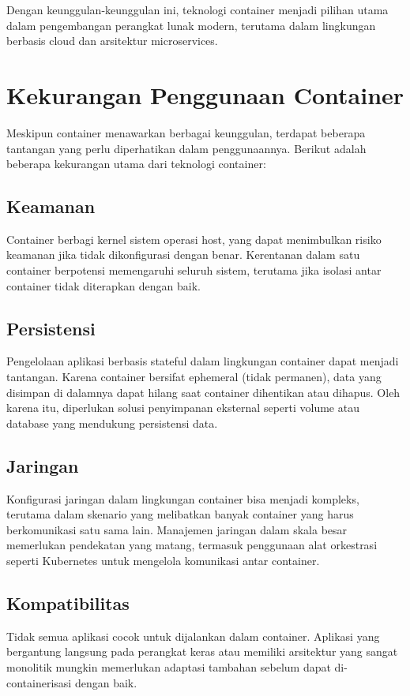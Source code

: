 Dengan keunggulan-keunggulan ini, teknologi container menjadi pilihan utama dalam pengembangan perangkat lunak modern, terutama dalam lingkungan berbasis cloud dan arsitektur microservices.



\section{Kekurangan Penggunaan Container}

Meskipun container menawarkan berbagai keunggulan, terdapat beberapa tantangan yang perlu diperhatikan dalam penggunaannya. Berikut adalah beberapa kekurangan utama dari teknologi container:

\subsection{Keamanan}
Container berbagi kernel sistem operasi host, yang dapat menimbulkan risiko keamanan jika tidak dikonfigurasi dengan benar. Kerentanan dalam satu container berpotensi memengaruhi seluruh sistem, terutama jika isolasi antar container tidak diterapkan dengan baik.

\subsection{Persistensi}
Pengelolaan aplikasi berbasis stateful dalam lingkungan container dapat menjadi tantangan. Karena container bersifat ephemeral (tidak permanen), data yang disimpan di dalamnya dapat hilang saat container dihentikan atau dihapus. Oleh karena itu, diperlukan solusi penyimpanan eksternal seperti volume atau database yang mendukung persistensi data.

\subsection{Jaringan}
Konfigurasi jaringan dalam lingkungan container bisa menjadi kompleks, terutama dalam skenario yang melibatkan banyak container yang harus berkomunikasi satu sama lain. Manajemen jaringan dalam skala besar memerlukan pendekatan yang matang, termasuk penggunaan alat orkestrasi seperti Kubernetes untuk mengelola komunikasi antar container.

\subsection{Kompatibilitas}
Tidak semua aplikasi cocok untuk dijalankan dalam container. Aplikasi yang bergantung langsung pada perangkat keras atau memiliki arsitektur yang sangat monolitik mungkin memerlukan adaptasi tambahan sebelum dapat di-containerisasi dengan baik.

